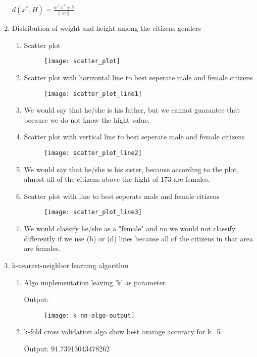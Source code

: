 \documentclass[12pt, a4paper]{article}
\begin{document}
\begin{enumerate}
    \(d(x^*, H) = \frac{w^\top x^* + b}{\parallel w \parallel}\)
    \pagebreak
	\item Distribution of weight and height among the citizens genders
	\begin{enumerate}
        \item Scatter plot
        \begin{figure}[h]
            \centering
            \texttt{[image: scatter\_plot]}
        \end{figure}
		\item Scatter plot with horizontal line to best seperate male and female citizens
        \begin{figure}[h]
            \centering
            \texttt{[image: scatter\_plot\_line1]}
        \end{figure}
		\item We would say that he/she is his father, but we cannot guarantee that because we do not know the hight value.
		\item Scatter plot with vertical line to best seperate male and female citizens
		\begin{figure}[h]
            \centering
            \texttt{[image: scatter\_plot\_line2]}
        \end{figure}
        \item We would say that he/she is his sister, because according to the plot, almost all of the citizens 
        above the hight of 173 are females.
        \item Scatter plot with line to best seperate male and female citizens
		\begin{figure}[h]
            \centering
            \texttt{[image: scatter\_plot\_line3]}
        \end{figure}
        \item We would classify he/she as a "female" and no we would not classify 
        differently if we use (b) or (d) lines because all of the citizens in that area 
        are females.
    \end{enumerate}
    
    \setcounter{enumi}{4}
    \item k-nearest-neighbor learning algorithm
    \begin{enumerate}
        \item Algo implementation leaving 'k' as parameter
        
        \newpage
        Output:
        \begin{figure}[h]
            \centering
            \texttt{[image: k-nn-algo-output]}
        \end{figure}
        \item k-fold cross validation algo show best avarage accuracy for k=5
        
        Output: 91.73913043478262
    \end{enumerate}

\end{enumerate}
\end{document}

